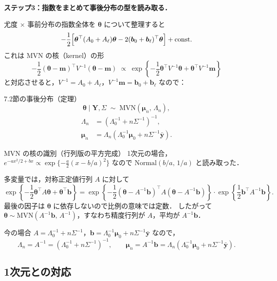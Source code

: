 \documentclass[lualatex,ja=standard,a4paper,12pt]{bxjsarticle}
\newcommand{\mvn}{\mathrm{MVN}}
\begin{document}
\textbf{ステップ3：指数をまとめて事後分布の型を読み取る．}

尤度 × 事前分布の指数全体を $\bm{\theta}$ について整理すると
\[
  -\frac{1}{2}\Bigl[\bm{\theta}^\top(A_0 + A_\ell)\bm{\theta} - 2(\bm{b}_0 + \bm{b}_\ell)^\top \bm{\theta}\Bigr] + \text{const}.
\]
これは $\mvn$ の核（kernel）の形
\[
  -\frac{1}{2}(\bm{\theta} - \bm{m})^\top V^{-1}(\bm{\theta} - \bm{m})
  \;\propto\;
  \exp\!\left\{-\frac{1}{2}\bm{\theta}^\top V^{-1}\bm{\theta} + \bm{\theta}^\top V^{-1}\bm{m}\right\}
\]
と対応させると，$V^{-1} = A_0 + A_\ell$，$V^{-1}\bm{m} = \bm{b}_0 + \bm{b}_\ell$ なので：

\begin{thmbox}{7.2節の事後分布（定理）}
\[
  \bm{\theta} \mid \bm{Y}, \Sigma \;\sim\; \mvn(\bm{\mu}_n,\, \Lambda_n),
\]
\begin{align}
  \Lambda_n &= \left(\Lambda_0^{-1} + n\Sigma^{-1}\right)^{-1}, \label{eq:Lambdan} \\
  \bm{\mu}_n &= \Lambda_n\!\left(\Lambda_0^{-1}\bm{\mu}_0 + n\Sigma^{-1}\bar{\bm{y}}\right). \label{eq:mun}
\end{align}
\end{thmbox}

\begin{derivbox}{MVN の核の識別（行列版の平方完成）}
1次元の場合，$e^{-ax^2/2+bx} \propto \exp\{-\frac{a}{2}(x - b/a)^2\}$
なので $\mathrm{Normal}(b/a,\, 1/a)$ と読み取った．

多変量では，対称正定値行列 $A$ に対して
\[
  \exp\!\left\{-\frac{1}{2}\bm{\theta}^\top A\bm{\theta} + \bm{\theta}^\top \bm{b}\right\}
  = \exp\!\left\{-\frac{1}{2}(\bm{\theta} - A^{-1}\bm{b})^\top A (\bm{\theta} - A^{-1}\bm{b})\right\}
    \cdot \exp\!\left\{\frac{1}{2}\bm{b}^\top A^{-1}\bm{b}\right\}.
\]
最後の因子は $\bm{\theta}$ に依存しないので比例の意味では定数．
したがって $\bm{\theta} \sim \mvn(A^{-1}\bm{b},\, A^{-1})$，すなわち精度行列が $A$，平均が $A^{-1}\bm{b}$．

今の場合 $A = \Lambda_0^{-1} + n\Sigma^{-1}$，$\bm{b} = \Lambda_0^{-1}\bm{\mu}_0 + n\Sigma^{-1}\bar{\bm{y}}$ なので，
\[
  \Lambda_n = A^{-1} = \left(\Lambda_0^{-1} + n\Sigma^{-1}\right)^{-1}, \qquad
  \bm{\mu}_n = A^{-1}\bm{b} = \Lambda_n\!\left(\Lambda_0^{-1}\bm{\mu}_0 + n\Sigma^{-1}\bar{\bm{y}}\right).
\]
\end{derivbox}

\subsection{1次元との対応}
\end{document}
